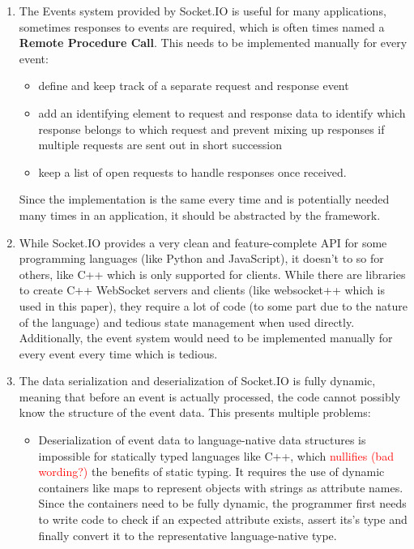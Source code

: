 \documentclass[conference]{IEEEtran}
\begin{document}
\begin{enumerate}
    \item The Events system provided by Socket.IO is useful for many applications, sometimes responses to events are required, which is often times named a \textbf{Remote Procedure Call}. This needs to be implemented manually for every event:
    \begin{itemize}
        \item define and keep track of a separate request and response event
        \item add an identifying element to request and response data to identify which response belongs to which request and prevent mixing up responses if multiple requests are sent out in short succession
        \item keep a list of open requests to handle responses once received.
    \end{itemize}
    Since the implementation is the same every time and is potentially needed many times in an application, it should be abstracted by the framework.
    \item While Socket.IO provides a very clean and feature-complete API for some programming languages (like Python and JavaScript), it doesn't to so for others, like C++ which is only supported for clients. While there are libraries to create C++ WebSocket servers and clients (like websocket++ which is used in this paper), they require a lot of code (to some part due to the nature of the language) and tedious state management when used directly. Additionally, the event system would need to be implemented manually for every event every time which is tedious.
    \item The data serialization and deserialization of Socket.IO is fully dynamic, meaning that before an event is actually processed, the code cannot possibly know the structure of the event data. This presents multiple problems:
    \begin{itemize}
        \item Deserialization of event data to language-native data structures is impossible for statically typed languages like C++, which \textcolor{red}{nullifies (bad wording?)} the benefits of static typing. It requires the use of dynamic containers like maps to represent objects with strings as attribute names. Since the containers need to be fully dynamic, the programmer first needs to write code to check if an expected attribute exists, assert its's type and finally convert it to the representative language-native type.

\end{itemize}
\end{enumerate}
\end{document}
